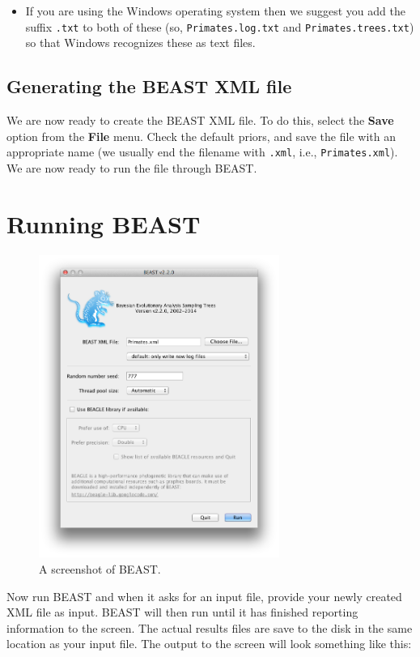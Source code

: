 \documentclass[11pt]{article}
\theoremstyle{plain}%
\theoremstyle{definition}
\theoremstyle{remark}
\begin{document}
\begin{itemize}
\item If you are using the Windows operating system then we suggest you add the suffix \texttt{.txt} to both of these (so,
\texttt{Primates.log.txt} and \texttt{Primates.trees.txt}) so that Windows recognizes
these as text files. 
\end{itemize}

\subsection{Generating the BEAST XML file }

We are now ready to create the BEAST XML file. To do this,
select the \textbf{Save} option from the \textbf{File} menu. 
Check the default priors, and save the file with an appropriate name
(we usually end the filename with \texttt{.xml}, i.e., \texttt{Primates.xml}).
We are now ready to run the file through BEAST. 

\section{Running BEAST }

\begin{figure}
\centering	
\includegraphics[width=0.7\textwidth]{figures/BEAST}
\caption{A screenshot of BEAST.}
\label{fig:BEAST}
\end{figure}

Now run BEAST and when it asks for an input file, provide your newly
created XML file as input. BEAST will then run until it has finished
reporting information to the screen. The actual results files are
save to the disk in the same location as your input file. The output to the screen will
look something like this: 
\end{document}
